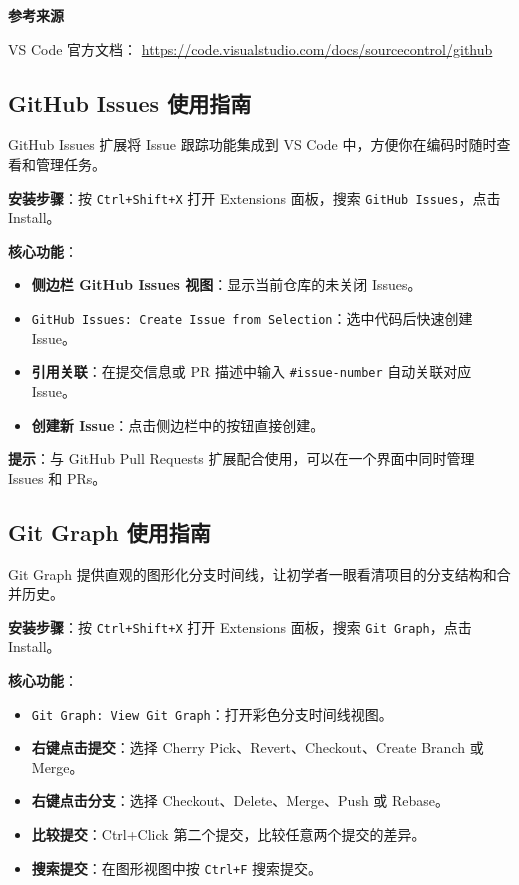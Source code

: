 \documentclass[12pt,a4paper,openany]{ctexbook}
\begin{document}
\begin{infobox}
\textbf{参考来源}

VS Code 官方文档：
\url{https://code.visualstudio.com/docs/sourcecontrol/github}
\end{infobox}

\subsection{GitHub Issues 使用指南}

GitHub Issues 扩展将 Issue 跟踪功能集成到 VS Code 中，方便你在编码时随时查看和管理任务。

\textbf{安装步骤}：按 \texttt{Ctrl+Shift+X} 打开 Extensions 面板，搜索 \texttt{GitHub Issues}，点击 Install。

\textbf{核心功能}：
\begin{itemize}[leftmargin=2em]
  \item \textbf{侧边栏 GitHub Issues 视图}：显示当前仓库的未关闭 Issues。
  \item \texttt{GitHub Issues: Create Issue from Selection}：选中代码后快速创建 Issue。
  \item \textbf{引用关联}：在提交信息或 PR 描述中输入 \texttt{\#issue-number} 自动关联对应 Issue。
  \item \textbf{创建新 Issue}：点击侧边栏中的按钮直接创建。
\end{itemize}

\textbf{提示}：与 GitHub Pull Requests 扩展配合使用，可以在一个界面中同时管理 Issues 和 PRs。

\subsection{Git Graph 使用指南}

Git Graph 提供直观的图形化分支时间线，让初学者一眼看清项目的分支结构和合并历史。

\textbf{安装步骤}：按 \texttt{Ctrl+Shift+X} 打开 Extensions 面板，搜索 \texttt{Git Graph}，点击 Install。

\textbf{核心功能}：
\begin{itemize}[leftmargin=2em]
  \item \texttt{Git Graph: View Git Graph}：打开彩色分支时间线视图。
  \item \textbf{右键点击提交}：选择 Cherry Pick、Revert、Checkout、Create Branch 或 Merge。
  \item \textbf{右键点击分支}：选择 Checkout、Delete、Merge、Push 或 Rebase。
  \item \textbf{比较提交}：Ctrl+Click 第二个提交，比较任意两个提交的差异。
  \item \textbf{搜索提交}：在图形视图中按 \texttt{Ctrl+F} 搜索提交。
\end{itemize}
\end{document}
